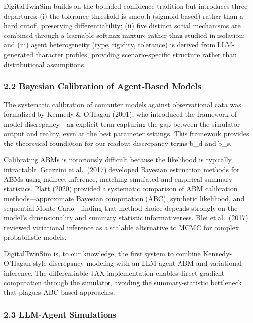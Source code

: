 \documentclass[
]{article}
\begin{document}
DigitalTwinSim builds on the bounded confidence tradition but introduces
three departures: (i) the tolerance threshold is smooth (sigmoid-based)
rather than a hard cutoff, preserving differentiability; (ii) five
distinct social mechanisms are combined through a learnable softmax
mixture rather than studied in isolation; and (iii) agent heterogeneity
(type, rigidity, tolerance) is derived from LLM-generated character
profiles, providing scenario-specific structure rather than
distributional assumptions.

\subsubsection{2.2 Bayesian Calibration of Agent-Based
Models}\label{bayesian-calibration-of-agent-based-models}

The systematic calibration of computer models against observational data
was formalized by Kennedy \& O'Hagan (2001), who introduced the
framework of model discrepancy---an explicit term capturing the gap
between the simulator output and reality, even at the best parameter
settings. This framework provides the theoretical foundation for our
readout discrepancy terms b\_d and b\_s.

Calibrating ABMs is notoriously difficult because the likelihood is
typically intractable. Grazzini et al.~(2017) developed Bayesian
estimation methods for ABMs using indirect inference, matching simulated
and empirical summary statistics. Platt (2020) provided a systematic
comparison of ABM calibration methods---approximate Bayesian computation
(ABC), synthetic likelihood, and sequential Monte Carlo---finding that
method choice depends strongly on the model's dimensionality and summary
statistic informativeness. Blei et al.~(2017) reviewed variational
inference as a scalable alternative to MCMC for complex probabilistic
models.

DigitalTwinSim is, to our knowledge, the first system to combine
Kennedy-O'Hagan-style discrepancy modeling with an LLM-agent ABM and
variational inference. The differentiable JAX implementation enables
direct gradient computation through the simulator, avoiding the
summary-statistic bottleneck that plagues ABC-based approaches.

\subsubsection{2.3 LLM-Agent Simulations}\label{llm-agent-simulations}
\end{document}
